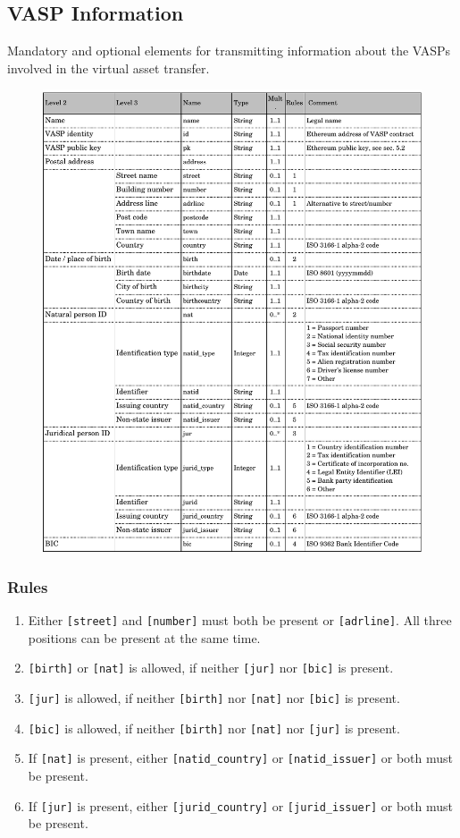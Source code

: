 \documentclass{article}
\begin{document}
\subsection{VASP Information}
Mandatory and optional elements for transmitting information about the VASPs involved in the virtual asset transfer.
\begin{figure}[h]
    \centering
    \includegraphics[width=\textwidth]{g27.pdf}
\end{figure}
\newpage

\subsubsection{Rules}
\renewcommand{\theenumi}{\arabic{enumi}}
\begin{enumerate}
\item Either \verb+[street]+ and \verb+[number]+ must both be present or \verb+[adrline]+. All three positions can be present at the same time.
\item \verb+[birth]+ or \verb+[nat]+ is allowed, if neither \verb+[jur]+ nor \verb+[bic]+ is present.
\item \verb+[jur]+ is allowed, if neither \verb+[birth]+ nor \verb+[nat]+ nor \verb+[bic]+ is present.
\item \verb+[bic]+ is allowed, if neither \verb+[birth]+ nor \verb+[nat]+ nor \verb+[jur]+ is present.
\item If \verb+[nat]+ is present, either \verb+[natid_country]+ or \verb+[natid_issuer]+ or both must be present.
\item If \verb+[jur]+ is present, either \verb+[jurid_country]+ or \verb+[jurid_issuer]+ or both must be present.
\end{enumerate}
\end{document}
